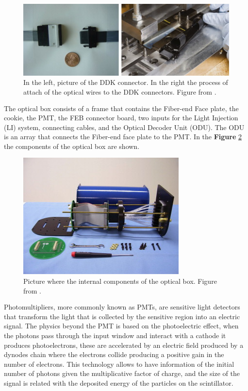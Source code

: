 \begin{figure}[!htb]
    \centering
    \includegraphics{Figures/Chapter2/OpticCablesConnectors.jpg}
    \caption{In the left, picture of the DDK connector. In the right the process of attach of the optical wires to the DDK connectors. Figure from \cite{MINERvA}.}
    \label{fig:MnvExp:MnvDetector:DDKConnector}
\end{figure}

The optical box consists of a frame that contains the Fiber-end Face plate, the cookie, the PMT, the FEB connector board, two inputs for the Light Injection (LI) system, connecting cables, and the Optical Decoder Unit (ODU). The ODU is an array that connects the Fiber-end face plate to the PMT. In the \textbf{Figure} \ref{fig:MnvExp:MnvDetector:OpticalBox} the components of the optical box are shown. 

\begin{figure}[!htb]
    \centering
    \includegraphics{Figures/Chapter2/OpticaBox.jpg}
    \caption{Picture where the internal components of the optical box. Figure from \cite{MINERvA}.}
    \label{fig:MnvExp:MnvDetector:OpticalBox}
\end{figure}

Photomultipliers, more commonly known as PMTs, are sensitive light detectors that transform the light that is collected by the sensitive region into an electric signal. The physics beyond the PMT is based on the photoelectric effect, when the photons pass through the input window and interact with a cathode it produces photoelectrons, these are accelerated by an electric field produced by a dynodes chain where the electrons collide producing a positive gain in the number of electrons. This technology allows to have information of the initial number of photons given the multiplicative factor of charge, and the size of the signal is related with the deposited energy of the particles on the scintillator. 

